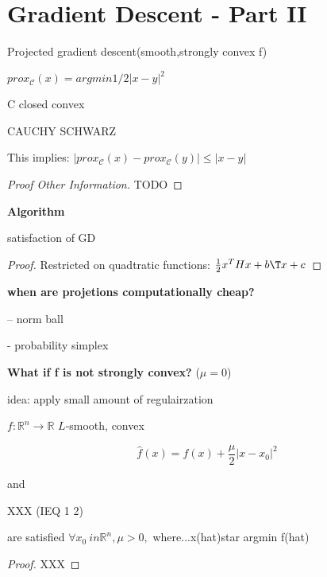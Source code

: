 \section{Gradient Descent - Part II}

Projected gradient descent(smooth,strongly convex f)

\begin{definition}[]
	$prox_\mathcal{C}(x)=argmin 1/2|x-y|^2$
\end{definition}

C closed convex

CAUCHY SCHWARZ

This implies:
$|prox_\mathcal{C}(x)-prox_\mathcal{C}(y)|\le|x-y|$


\begin{proof}[Proof Other Information]
	TODO
\end{proof}

\textbf{Algorithm}

\begin{proposition}
	satisfaction of GD
\end{proposition}

\begin{proof}[Proof]
	Restricted on quadtratic functions:
	$\frac{1}{2}x^THx+b\T x +c$

\end{proof}

\textbf{when are projetions computationally cheap?}

-- norm ball

- probability simplex

\textbf{What if f is not strongly convex?} ($\mu=0$)

\rightarrow idea: apply small amount of regulairzation

$f: \mathbb{R}^{n}\rightarrow \mathbb{R}$ $L$-smooth, convex

\[\hat{f}(x) = f(x)+\frac{\mu}{2}|x-x_0|^2\]

and

XXX (IEQ 1 2)

are satisfied $\forall x_0 \ in \mathbb{R}^{n}, \mu > 0,$
where...x(hat)star argmin f(hat)


\begin{proof}[Proof]
	XXX
\end{proof}

